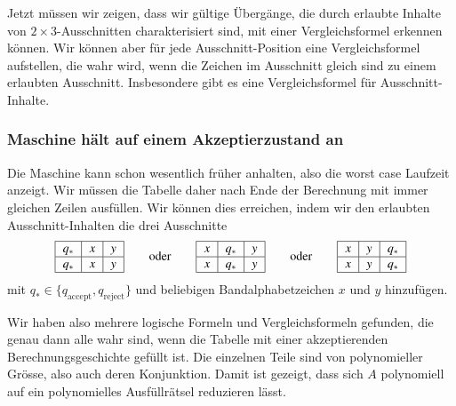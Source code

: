 Jetzt müssen wir zeigen, dass wir gültige Übergänge, die durch erlaubte
Inhalte von $2\times 3$-Ausschnitten charakterisiert sind, mit
einer Vergleichsformel erkennen können.
Wir können aber für jede Ausschnitt-Position eine Vergleichsformel
aufstellen, die wahr wird, wenn die Zeichen im Ausschnitt 
gleich sind zu einem erlaubten Ausschnitt.
Insbesondere gibt es eine Vergleichsformel für Ausschnitt-Inhalte.


\subsubsection{Maschine hält auf einem Akzeptierzustand an}
Die Maschine kann schon wesentlich früher anhalten, also die worst case
Laufzeit anzeigt.
Wir müssen die Tabelle daher nach Ende der Berechnung mit immer gleichen
Zeilen ausfüllen.
Wir können dies erreichen, indem wir den erlaubten Ausschnitt-Inhalten
die drei Ausschnitte
\[
\begin{tabular}{|>{$}c<{$}|>{$}c<{$}|>{$}c<{$}|}
\hline
q_*&x&y\\
\hline
q_*&x&y\\
\hline
\end{tabular}
\qquad\text{oder}\qquad
\begin{tabular}{|>{$}c<{$}|>{$}c<{$}|>{$}c<{$}|}
\hline
x&q_*&y\\
\hline
x&q_*&y\\
\hline
\end{tabular}
\qquad\text{oder}\qquad
\begin{tabular}{|>{$}c<{$}|>{$}c<{$}|>{$}c<{$}|}
\hline
x&y&q_*\\
\hline
x&y&q_*\\
\hline
\end{tabular}
\]
mit $q_*\in\{q_\text{accept},q_\text{reject}\}$ und beliebigen
Bandalphabetzeichen $x$ und $y$ hinzufügen.

Wir haben also mehrere logische Formeln und Vergleichsformeln
gefunden, die genau dann alle wahr sind, wenn die Tabelle mit einer
akzeptierenden Berechnungsgeschichte gefüllt ist.
Die einzelnen Teile sind von polynomieller Grösse, also auch deren
Konjunktion.
Damit ist gezeigt, dass sich $A$ polynomiell auf ein polynomielles
Ausfüllrätsel reduzieren lässt.


